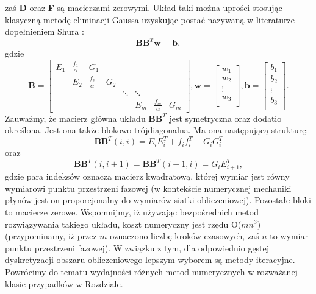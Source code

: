 \documentclass[12pt]{article}
\begin{document}
zaś \textbf{D} oraz \textbf{F} są macierzami zerowymi.\newline
Układ taki można uprości stosując klasyczną metodę eliminacji Gaussa uzyskując postać nazywaną w literaturze dopełnieniem Shura \cite{Qiqi2}:
\begin{equation}
\textbf{B}\textbf{B}^{T}\textbf{w} = \textbf{b},
\label{LSS_v13}
\end{equation}
gdzie
\begin{equation}
\textbf{B} = \begin{bmatrix}
E_{1} & \frac{f_{1}}{\alpha} & G_{1} &  &  &  &  &  \\
& E_{2} & \frac{f_{2}}{\alpha} & G_{2} &  &  &  &  \\
&  &  &  & \ddots & \ddots &  &  \\
&  &  &  &  & E_{m} & \frac{f_{m}}{\alpha} & G_{m} 
\end{bmatrix},
\textbf{w} = \begin{bmatrix}
w_{1} \\
w_{2} \\
\vdots \\
w_{3}\\
\end{bmatrix},
\textbf{b} = \begin{bmatrix}
b_{1} \\
b_{2} \\
\vdots \\
b_{3}\\
\end{bmatrix}.	
\label{LSS_v14}
\end{equation}
Zauważmy, że macierz główna układu $ \textbf{B}\textbf{B}^{T} $ jest symetryczna oraz dodatio określona. Jest ona także blokowo-trójdiagonalna. Ma ona następującą strukturę:
\begin{equation}
\textbf{B}\textbf{B}^{T}(i,i) = E_{i}E_{i}^{T}+f_{i}f_{i}^{T}+G_{i}G_{i}^{T} 
\label{LSS_v16}
\end{equation}
oraz
\begin{equation}
\textbf{B}\textbf{B}^{T}(i,i+1) = \textbf{B}\textbf{B}^{T}(i+1,i) = G_{i}E_{i+1}^{T},
\label{LSS_v17}
\end{equation}
gdzie para indeksów oznacza macierz kwadratową, której wymiar jest równy wymiarowi punktu przestrzeni fazowej (w kontekście numerycznej mechaniki płynów jest on proporcjonalny do wymiarów siatki obliczeniowej). Pozostałe bloki to macierze zerowe. Wspomnijmy, iż używając bezpośrednich metod rozwiązywania takiego układu, koszt numeryczny jest rzędu O($ mn^{3} $) (przypominamy, iż przez $ m $ oznaczono liczbę kroków czasowych, zaś $ n $ to wymiar punktu przestrzeni fazowej). W związku z tym, dla odpowiednio gęstej dyskretyzacji obszaru obliczeniowego lepszym wyborem są metody iteracyjne. Powrócimy do tematu wydajności różnych metod numerycznych w rozważanej klasie przypadków w Rozdziale. \newline
\end{document}
